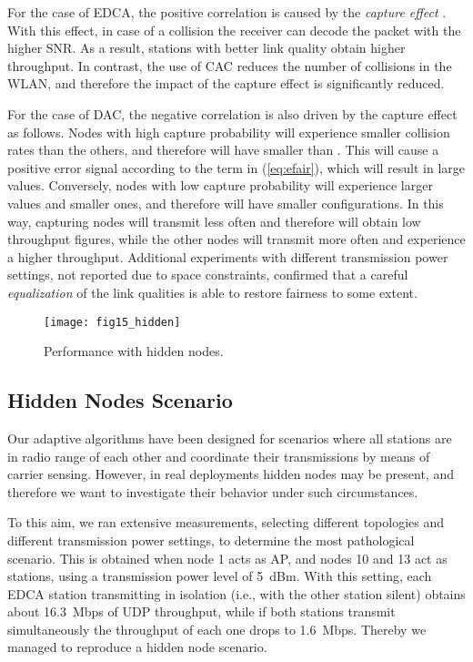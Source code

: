 \documentclass[a4paper,10pt]{article}
\newcommand{\revs}[1]{\textcolor{black}{#1}}
\begin{document}
For the case of EDCA, the positive correlation is caused by the \emph{capture effect} \revs{\cite{hadzi02}}. With this effect, in case of a collision the receiver can decode the packet with the higher SNR. As a result, stations with better link quality obtain higher throughput. In contrast, the use of CAC reduces the number of collisions in the WLAN, and therefore the impact of the capture effect is significantly reduced. 



For the case of DAC, the negative correlation is also driven by the capture effect as follows. Nodes with high capture probability will experience smaller collision rates than the others, and therefore will have  smaller than . This will cause a positive error signal according to the  term in (\ref{eq:efair}), which will result in large  values. Conversely, nodes with low capture probability will experience larger  values and smaller  ones, and therefore will have smaller  configurations. In this way, capturing nodes will transmit less often and therefore will obtain low throughput figures, while the other nodes will transmit more often and experience a higher throughput. Additional experiments with different transmission power settings, not reported due to space constraints, confirmed that a careful \emph{equalization} of the link qualities is able to restore fairness to some extent. 







\begin{figure}\texttt{[image: fig15\_hidden]}\caption{Performance with hidden nodes.}\label{fig:hidden}\end{figure}

\subsection{Hidden Nodes Scenario}
\label{sec:hidden}

Our adaptive algorithms have been designed for scenarios where all stations are in radio range of each other and coordinate their transmissions by means of carrier sensing. However, in real deployments hidden nodes may be present, and therefore we want to investigate their behavior under such circumstances. 

To this aim, we ran extensive measurements, selecting different topologies and different transmission power settings, to determine the most pathological scenario. This is obtained when node 1 acts as AP, and nodes 10 and 13 act as stations, using a transmission power level of 5~dBm. With this setting, each EDCA station transmitting in isolation (i.e., with the other station silent) obtains about 16.3~Mbps of UDP throughput, while if both stations transmit simultaneously the throughput of each one drops to 1.6~Mbps. Thereby we managed to reproduce a hidden node scenario.
\end{document}
